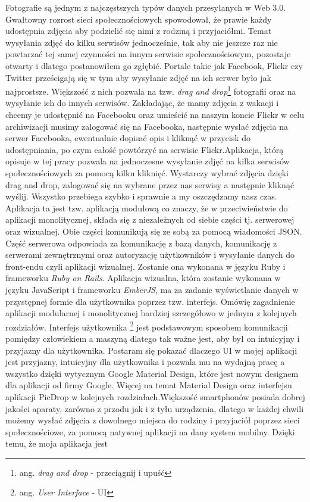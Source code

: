 \documentclass[brudnopis]{xmgr}
\begin{document}
\maketitle
%
\introduction
\indent Fotografie są jednym z najczęstszych typów danych przesyłanych w Web 3.0. Gwałtowny rozrost sieci społecznościowych spowodował, że prawie każdy udostępnia zdjęcia aby podzielić się nimi z rodziną i przyjaciółmi. Temat wysyłania zdjęć do kilku serwisów jednocześnie, tak aby nie jeszcze raz nie powtarzać tej samej czynności na innym serwisie społecznościowym, pozostaje otwarty i dlatego postanowiłem go zgłębić.
\newline\indent Portale takie jak Facebook, Flickr czy Twitter prześcigają się w tym aby wysyłanie zdjęć na ich serwer było jak najprostsze. Większość z nich pozwala na tzw. \textit{drag and drop}\footnote{ang. \textit{drag and drop} - przeciągnij i upuść} fotografii oraz na wysyłanie ich do innych serwisów. Zakładając, że mamy zdjęcia z wakacji i chcemy je udostępnić na Facebooku oraz umieścić na naszym koncie Flickr w celu archiwizacji musimy zalogować się na Facebooka, następnie wysłać zdjęcia na serwer Facebooka, ewentualnie dopisać opis i kliknąć w przycisk do udostępniania, po czym całość powtórzyć na serwisie Flickr.Aplikacja, którą opisuje w tej pracy pozwala na jednoczesne wysyłanie zdjęć na kilka serwisów społecznościowych za pomocą kilku kliknięć. Wystarczy wybrać zdjęcia dzięki drag and drop, zalogować się na wybrane przez nas serwisy a następnie kliknąć wyślij. Wszystko przebiega szybko i sprawnie a my oszczędzamy nasz czas.  Aplikacja ta jest tzw. aplikacją modułową co znaczy, że w przeciwieństwie do aplikacji monolitycznej, składa się z  niezależnych od siebie części tj. serwerowej oraz wizualnej. Obie części komunikują się ze sobą za pomocą wiadomości JSON. Część serwerowa odpowiada za komunikację z bazą danych, komunikację z serwerami zewnętrznymi oraz autoryzację użytkowników i wysyłanie danych do front-endu czyli aplikacji wizualnej. Zostanie ona wykonana w języku Ruby i frameworku \textit{Ruby on Rails}.   Aplikacja wizualna, która zostanie wykonana w języku JavaScript i frameworku \textit{EmberJS}, ma za zadanie wyświetlanie danych w przystępnej formie dla użytkownika poprzez tzw. interfejs. Omówię zagadnienie aplikacji modularnej i monolitycznej bardziej szczegółowo w jednym z kolejnych rozdziałów. Interfejs użytkownika \footnote{ang. \textit{User Interface} - UI}  jest podstawowym sposobem komunikacji pomiędzy człowiekiem a maszyną dlatego tak ważne jest, aby był on intuicyjny i przyjazny dla użytkownika. Postaram się pokazać dlaczego UI w mojej aplikacji jest przyjazny, intuicyjny dla użytkownika i pozwala mu na wydajną pracę a wszystko dzięki wytycznym Google Material Design, które jest nowym designem dla aplikacji od firmy Google. Więcej na temat Material Design oraz interfejsu aplikacji PicDrop w kolejnych rozdziałach.\newline \indent Większość smartphonów posiada dobrej jakości aparaty, zarówno z przodu jak i z tyłu urządzenia, dlatego w każdej chwili możemy wysłać zdjęcia z dowolnego miejsca do rodziny i przyjaciół poprzez sieci społecznościowe, za pomocą natywnej aplikacji na dany system mobilny. Dzięki temu, że moja aplikacja jest 
\end{document}
